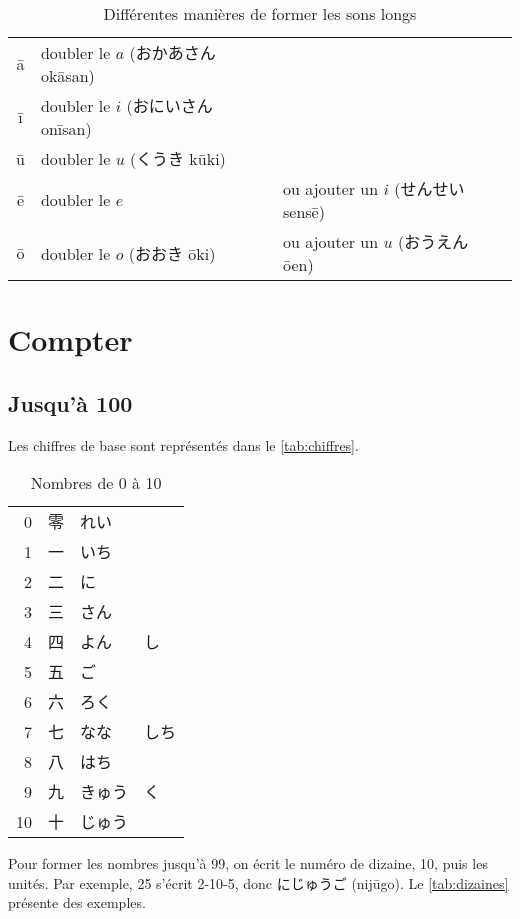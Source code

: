 \documentclass[a4paper,10pt,french,openany]{memoir}
\begin{document}
\begin{table}[htp]
 \centering
 \caption{Différentes manières de former les sons longs}
 \label{tab:long-sounds}
 \begin{tabular}{cll}
  ā & doubler le $a$ (おかあさん okāsan)\\
  ī & doubler le $i$ (おにいさん onīsan)\\
  ū & doubler le $u$ (くうき kūki)\\
  ē & doubler le $e$ & ou ajouter un $i$ (せんせい sensē)\\
  ō & doubler le $o$ (おおき ōki) & ou ajouter un $u$ (おうえん ōen)\\
 \end{tabular}
\end{table}

\section{Compter}
\subsection{Jusqu'à 100}

Les chiffres de base sont représentés dans le \autoref{tab:chiffres}.

\begin{table}[htp]
 \centering
 \caption{Nombres de 0 à 10}
 \label{tab:chiffres}
 \begin{tabular}{rlll}
  0 & 零 & れい\\
  1 & 一 & いち\\
  2 & 二 & に\\
  3 & 三 & さん\\
  4 & 四 & よん & し\\
  5 & 五 & ご\\
  6 & 六 & ろく\\
  7 & 七 & なな & しち\\
  8 & 八 & はち\\
  9 & 九 & きゅう & く\\
 10 & 十 & じゅう
 \end{tabular}
\end{table}

Pour former les nombres jusqu'à 99, on écrit le numéro de dizaine, 10, puis les unités. Par exemple, 25 s'écrit 2-10-5, donc にじゅうご (nijūgo). Le \autoref{tab:dizaines} présente des exemples.
\end{document}
